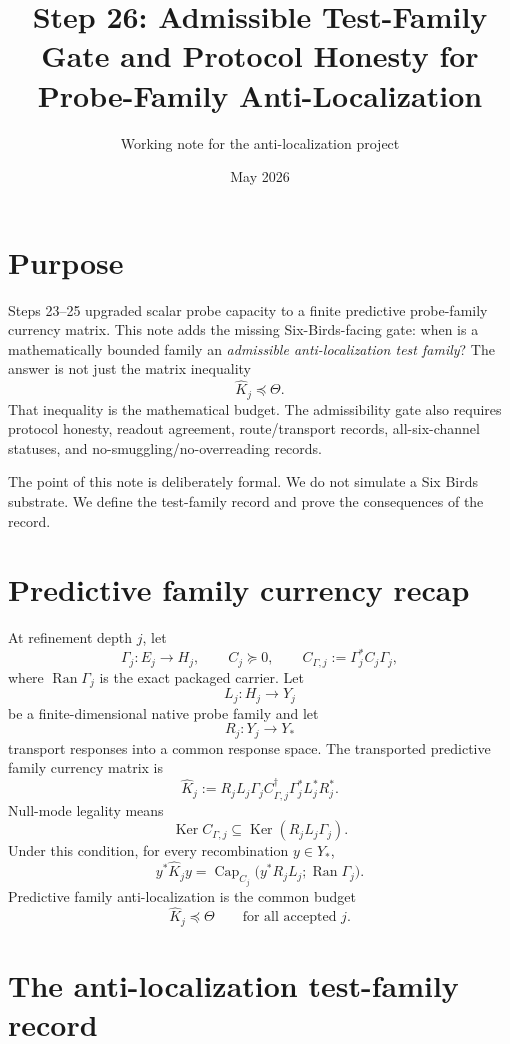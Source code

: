 \documentclass[11pt]{article}
\title{Step 26: Admissible Test-Family Gate and Protocol Honesty for Probe-Family Anti-Localization}
\author{Working note for the anti-localization project}
\date{May 2026}
\newcommand{\Ran}{\operatorname{Ran}}
\newcommand{\Ker}{\operatorname{Ker}}
\providecommand{\Cap}{\operatorname{Cap}}
\newcommand{\Loewner}{\preceq}
\begin{document}
\maketitle

\section{Purpose}

Steps 23--25 upgraded scalar probe capacity to a finite predictive probe-family currency matrix.  This note adds the missing Six-Birds-facing gate: when is a mathematically bounded family an \emph{admissible anti-localization test family}?  The answer is not just the matrix inequality
\[
  \widehat K_j \Loewner \Theta.
\]
That inequality is the mathematical budget.  The admissibility gate also requires protocol honesty, readout agreement, route/transport records, all-six-channel statuses, and no-smuggling/no-overreading records.

The point of this note is deliberately formal.  We do not simulate a Six Birds substrate.  We define the test-family record and prove the consequences of the record.

\section{Predictive family currency recap}

At refinement depth $j$, let
\[
  \Gamma_j:E_j\to H_j,
  \qquad
  C_j\succeq0,
  \qquad
  C_{\Gamma,j}:=\Gamma_j^*C_j\Gamma_j,
\]
where $\Ran\Gamma_j$ is the exact packaged carrier.  Let
\[
  L_j:H_j\to Y_j
\]
be a finite-dimensional native probe family and let
\[
  R_j:Y_j\to Y_*
\]
transport responses into a common response space.  The transported predictive family currency matrix is
\[
  \widehat K_j
  :=
  R_jL_j\Gamma_j C_{\Gamma,j}^\dagger\Gamma_j^*L_j^*R_j^*.
\]
Null-mode legality means
\[
  \Ker C_{\Gamma,j}\subseteq \Ker(R_jL_j\Gamma_j).
\]
Under this condition, for every recombination $y\in Y_*$,
\[
  y^*\widehat K_jy
  =
  \Cap_{C_j}\bigl(y^*R_jL_j;\Ran\Gamma_j\bigr).
\]
Predictive family anti-localization is the common budget
\[
  \widehat K_j\Loewner\Theta
  \qquad
  \text{for all accepted }j.
\]

\section{The anti-localization test-family record}
\end{document}
